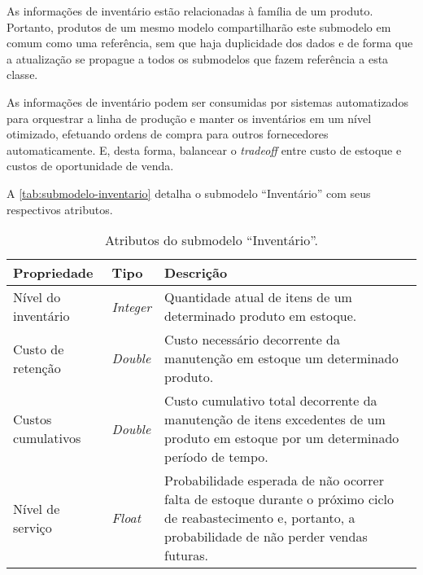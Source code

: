 As informações de inventário estão relacionadas à família de um produto. Portanto, produtos de um mesmo modelo compartilharão este submodelo em comum como uma referência, sem que haja duplicidade dos dados e de forma que a atualização se propague a todos os submodelos que fazem referência a esta classe.

As informações de inventário podem ser consumidas por sistemas automatizados para orquestrar a linha de produção e manter os inventários em um nível otimizado, efetuando ordens de compra para outros fornecedores automaticamente. E, desta forma, balancear o \textit{tradeoff} entre custo de estoque e custos de oportunidade de venda.

A \autoref{tab:submodelo-inventario} detalha o submodelo ``Inventário'' com seus respectivos atributos.

\begin{table}[htb]
	\centering
	\caption{Atributos do submodelo ``Inventário''.}
	\begin{tabular}{p{3.5cm}p{1.5cm}p{9cm}}
		\hline
		\textbf{Propriedade}
		 & \textbf{Tipo}
		 & \textbf{Descrição}                                                                                                                                           \\

		\hline
		Nível do inventário
		 & \textit{Integer}
		 & Quantidade atual de itens de um determinado produto em estoque.                                                                                              \\

		\hline
		Custo de retenção
		 & \textit{Double}
		 & Custo necessário decorrente da manutenção em estoque um determinado produto.                                                                                 \\

		\hline
		Custos cumulativos
		 & \textit{Double}
		 & Custo cumulativo total decorrente da manutenção de itens excedentes de um produto em estoque por um determinado período de tempo.                            \\

		\hline
		Nível de serviço
		 & \textit{Float}
		 & Probabilidade esperada de não ocorrer falta de estoque durante o próximo ciclo de reabastecimento e, portanto, a probabilidade de não perder vendas futuras. \\

		\hline
	\end{tabular}
	\label{tab:submodelo-inventario}
\end{table}

